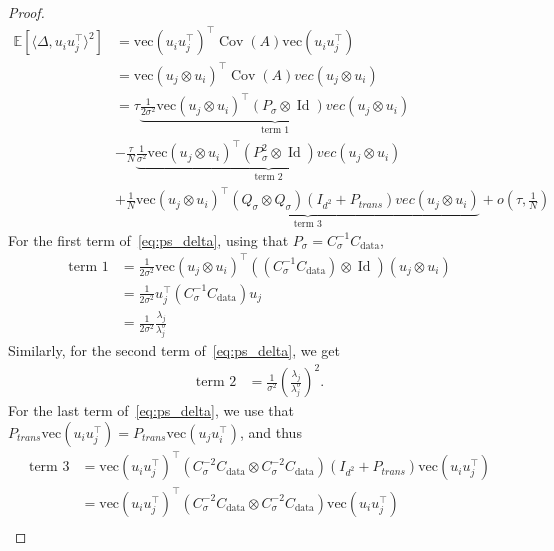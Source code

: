 \documentclass[11pt]{article}
\newcommand{\id}{\operatorname{Id}}
\newcommand{\EE}{\mathbb{E}}
\newcommand{\cov}{\operatorname{Cov}}
\begin{document}
\begin{proof}
\begin{align} 
\EE[\langle \Delta, u_i u_j^\top \rangle ^2]   &=\text{vec}(u_i u_j^\top)^\top \cov(A) \text{vec}(u_i u_j^\top) \\
    &= \text{vec}(u_j \otimes u_i)^\top \cov(A) vec(u_j \otimes u_i) \\
    &=  \label{eq:ps_delta} \tau  \underbrace{ \frac{1}{2\sigma^2} \text{vec}(u_j \otimes u_i)^\top (P_\sigma \otimes \id) vec(u_j \otimes u_i)}_{\text{term 1}} \\
    &- \nonumber \frac{\tau}{N}  \underbrace{\frac{1}{\sigma^2} \text{vec}(u_j \otimes u_i)^\top (P_\sigma^2 \otimes \id) vec(u_j \otimes u_i)}_{\text{term 2}} \\ \nonumber &+ \frac{1}{N} \underbrace{\text{vec}(u_j \otimes u_i)^\top \left( Q_\sigma \otimes Q_\sigma \right) (I_{d^2} + P_{trans}) vec(u_j \otimes u_i)}_{\text{term 3}} + o \left(\tau, \frac{1}{N}\right) 
    \end{align}
For the first term of~\eqref{eq:ps_delta}, using that $P_\sigma = C_\sigma^{-1} C_\mathrm{data}$,
 \begin{align*}
 \text{term 1} %
 &= \frac{1}{2\sigma^2}\text{vec}(u_j \otimes u_i)^\top (\left( C_\sigma^{-1} C_\mathrm{data} \right) \otimes \id) (u_j \otimes u_i) \\
    &= \frac{1}{2\sigma^2} u_j^\top \left( C_\sigma^{-1} C_\mathrm{data} \right) u_j \\
    &=  \frac{1}{2\sigma^2} \frac{\lambda_j}{\lambda^\sigma_j}
\end{align*}
Similarly, for the second term of~\eqref{eq:ps_delta}, we get 
\begin{align*}
    \text{term 2} &=  \frac{1}{\sigma^2}\left( \frac{\lambda_j}{\lambda^\sigma_j}\right)^2.
\end{align*}
For the last term of~\eqref{eq:ps_delta}, we use that $ P_{trans} \text{vec}(u_i u_j^\top) =  P_{trans} \text{vec}(u_j u_i^\top)$, and thus 
\begin{align*}
      \text{term 3}  &= \text{vec}(u_i u_j^\top)^\top (C_\sigma^{-2} C_\mathrm{data} \otimes C_\sigma^{-2} C_\mathrm{data})(I_{d^2} + P_{trans}) \text{vec}(u_i u_j^\top) \\
    &= \text{vec}(u_i u_j^\top)^\top (C_\sigma^{-2} C_\mathrm{data} \otimes C_\sigma^{-2} C_\mathrm{data}) \text{vec}(u_i u_j^\top) \\

\end{align*}
\end{proof}
\end{document}

